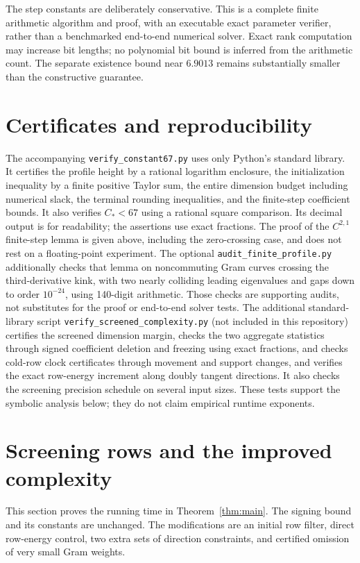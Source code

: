 \documentclass[11pt]{amsart}
\theoremstyle{remark}\newtheorem{remark}[theorem]{Remark}
\begin{document}
The step constants are deliberately conservative. This is a complete
finite arithmetic algorithm and proof, with an executable exact parameter
verifier, rather than a benchmarked end-to-end numerical solver. Exact
rank computation may increase bit lengths; no polynomial bit bound is
inferred from the arithmetic count. The separate existence bound near
$6.9013$ remains substantially smaller than the constructive guarantee.

\section{Certificates and reproducibility}

The accompanying \texttt{verify\_constant67.py} uses only Python's standard
library. It certifies the profile height by a rational logarithm enclosure,
the initialization inequality by a finite positive Taylor sum,
the entire dimension budget including numerical slack, the terminal
rounding inequalities, and the finite-step coefficient bounds.
It also verifies $C_*<67$ using a rational square comparison. Its decimal
output is for readability; the assertions use exact fractions.
The proof of the $C^{2,1}$ finite-step lemma is given above, including the
zero-crossing case, and does not rest on a floating-point experiment.
The optional \texttt{audit\_finite\_profile.py} additionally checks that
lemma on noncommuting Gram curves crossing the third-derivative kink,
with two nearly colliding leading eigenvalues and gaps down to order
$10^{-24}$, using 140-digit arithmetic. Those checks are supporting audits,
not substitutes for the proof or end-to-end solver tests.
The additional standard-library script
\texttt{verify\_screened\_complexity.py} (not included in this repository)
certifies the screened dimension
margin, checks the two aggregate statistics through signed
coefficient deletion and freezing using exact fractions, and checks cold-row
clock certificates through movement and support changes, and verifies
the exact row-energy increment along doubly tangent directions. It also checks
the screening precision schedule on several input sizes. These tests
support the symbolic analysis below; they do not claim empirical runtime
exponents.

\section{Screening rows and the improved complexity}\label{sec:screening}

This section proves the running time in Theorem~\ref{thm:main}.
The signing bound and its constants are unchanged. The modifications are
an initial row filter, direct row-energy control, two extra sets of direction
constraints, and certified omission of very small Gram weights.
\end{document}
